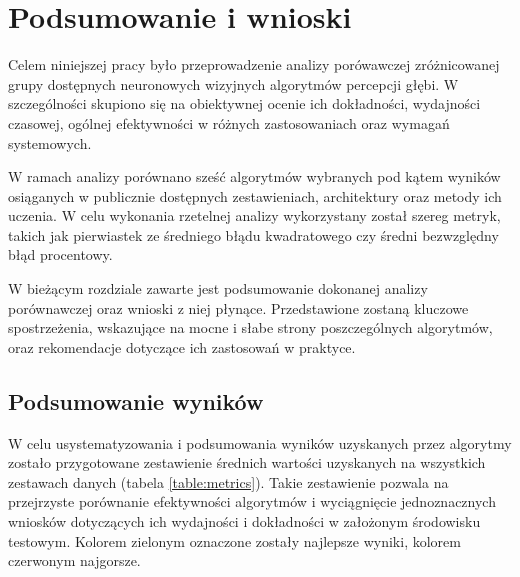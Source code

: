 \chapter{Podsumowanie i wnioski}\label{chap:podsumowanie_i_wnioski}
Celem niniejszej pracy było przeprowadzenie analizy porówawczej zróżnicowanej grupy dostępnych neuronowych wizyjnych algorytmów percepcji głębi. W szczególności skupiono się na obiektywnej ocenie ich dokładności, wydajności czasowej, ogólnej efektywności w różnych zastosowaniach oraz wymagań systemowych.

W ramach analizy porównano sześć algorytmów wybranych pod kątem wyników osiąganych w publicznie dostępnych zestawieniach, architektury oraz metody ich uczenia. W celu wykonania rzetelnej analizy wykorzystany został szereg metryk, takich jak pierwiastek ze średniego błądu kwadratowego czy średni bezwzględny błąd procentowy.

W bieżącym rozdziale zawarte jest podsumowanie dokonanej analizy porównawczej oraz wnioski z niej płynące. Przedstawione zostaną kluczowe spostrzeżenia, wskazujące na mocne i słabe strony poszczególnych algorytmów, oraz rekomendacje dotyczące ich zastosowań w praktyce.

\section{Podsumowanie wyników}
W celu usystematyzowania i podsumowania wyników uzyskanych przez algorytmy zostało przygotowane zestawienie średnich wartości uzyskanych na wszystkich zestawach danych (tabela \ref{table:metrics}). Takie zestawienie pozwala na przejrzyste porównanie efektywności algorytmów i wyciągnięcie jednoznacznych wniosków dotyczących ich wydajności i dokładności w założonym środowisku testowym. Kolorem zielonym oznaczone zostały najlepsze wyniki, kolorem czerwonym najgorsze.

